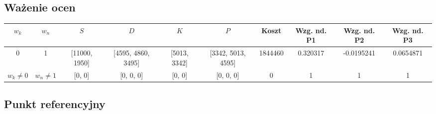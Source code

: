 \documentclass[a4paper, 10pt]{article}
\begin{document}
\newpage

\begin{landscape}
\subsection{Ważenie ocen}


\begin{center}
    \begin{tabular}{ | c | c | c | c | c | c | c | c | c | c |}
    \hline
    $w_k$ & $w_n$ & $S$ & $D$ & $K$ & $P$ & \textcolor{orange!80}{Koszt} & \textcolor{orange!80}{Wzg. nd. P1}  & \textcolor{orange!80}{Wzg. nd. P2} & \textcolor{orange!80}{Wzg. nd. P3} \\ \hline
	0 & 1 &  [11000, 1950] &  [4595, 4860, 3495] &  [5013, 3342] &  [3342, 5013, 4595] & 1844460 & 0.320317 & -0.0195241 & 0.0654871\\ \hline
	$w_k \ne 0$ & $w_n \ne 1$ &  [0, 0] &  [0, 0, 0] &  [0, 0] &  [0, 0, 0] & 0 & 1 & 1 & 1 \\ \hline
    \end{tabular}
\end{center}






\subsection{Punkt referencyjny}



\begin{center}
    \begin{tabular}{ | l | c | c | c | c | c | c | c | c |c |}
    \hline
	

\end{tabular}
\end{center}
\end{landscape}
\end{document}
